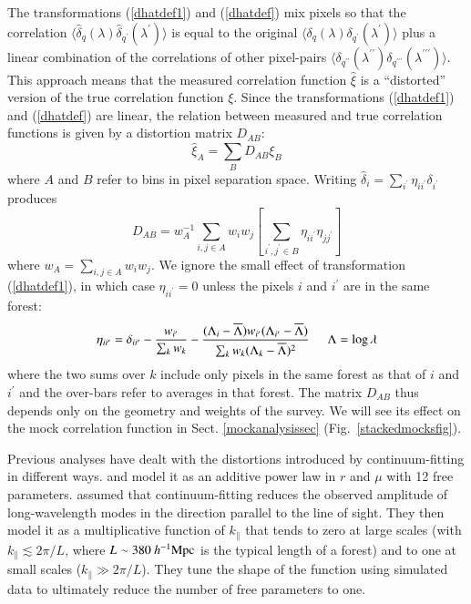 \documentclass{aa}
\newcommand{\xif}{\xi}
\newcommand{\xifhat}{\hat{\xi}}
\newcommand{\dhatqlam}{\hat\delta_q(\lambda)}
\newcommand{\hMpc}{h^{-1}{\rm Mpc}}
\begin{document}
The transformations (\ref{dhatdef1}) and (\ref{dhatdef}) mix
pixels so that the correlation 
$\langle \dhatqlam \hat\delta_{q^\prime}(\lambda^\prime) \rangle$
is equal to the original 
$\langle \delta_q(\lambda) \delta_{q^\prime}(\lambda^\prime) \rangle$
plus a linear combination of the correlations of
other pixel-pairs
$\langle  \delta_{q^{\prime\prime}}(\lambda^{\prime\prime})
\delta_{q^{\prime\prime\prime}}(\lambda^{\prime\prime\prime}) \rangle$.
This approach means that the measured correlation function $\xifhat$
is a ``distorted'' version of the true correlation function $\xif$.
Since the transformations (\ref{dhatdef1}) and (\ref{dhatdef}) are
linear, the relation between measured and true correlation functions
is given by a distortion matrix $D_{AB}$:
\begin{equation}
  \xifhat_A  = \sum_{B}D_{AB}\xif_{B}
\label{DABfirstuseeq}
\end{equation}
where $A$ and $B$ refer to  bins in pixel separation space.
Writing $\hat\delta_i=\sum_{i^\prime}\eta_{ii^\prime}\delta_{i^\prime}$ produces
\begin{equation}
D_{AB} = w_A^{-1}
\sum_{i,j\in A}w_iw_j 
\left[
\sum_{i^\prime,j^\prime \in B}\eta_{ii^\prime}\eta_{jj^\prime} 
\right]
\label{DABeq}
\end{equation}
where $w_A=\sum_{i,j\in A}w_iw_j$.
We ignore the small effect of transformation  (\ref{dhatdef1}),
in which case 
$\eta_{ii^\prime}=0$ unless the pixels $i$ and $i^\prime$ are in the
same forest:
\begin{equation}
\eta_{ii^\prime}= \delta_{ii^\prime}- \frac{w_{i^\prime}}{\sum_{k}w_k}
-
\frac{(\Lambda_i-\overline{\Lambda})w_{i^\prime}(\Lambda_{i^\prime}-\overline{\Lambda})}
{\sum_{k}w_k(\Lambda_k-\overline{\Lambda})^2}
\hspace*{5mm}
\Lambda=\log\lambda
\end{equation}
where the two sums over $k$ include only pixels in the same forest as
that of $i$ and $i^\prime$ and the over-bars refer to averages in that forest.
The matrix $D_{AB}$ thus depends only on the geometry and weights of the survey.
We will see its effect on the mock correlation function
in Sect. \ref{mockanalysissec} (Fig.~\ref{stackedmocksfig}).


  Previous analyses
  \citep{2013A&A...552A..96B,2013JCAP...04..026S,2015A&A...574A..59D,2015JCAP...11..034B}
have dealt with the distortions introduced by continuum-fitting in
different ways.
\citet{2013A&A...552A..96B} and \citet{2015A&A...574A..59D}
model it as an
additive power law in $r$ and $\mu$ with 12 free parameters.
\citet{2015JCAP...11..034B}
assumed that continuum-fitting reduces the observed
amplitude of long-wavelength modes in the direction parallel to the
line of sight. They then model it as a multiplicative function
of $k_\parallel$ that
tends to zero at large scales (with $k_\parallel\lesssim 2\pi/L$,
where $L\sim380~\hMpc$ is the typical length of a forest)
and to one at small scales ($k_\parallel\gg2\pi/L$).
They tune the shape of the function using simulated data to ultimately
reduce the number of free parameters to one.
\end{document}
